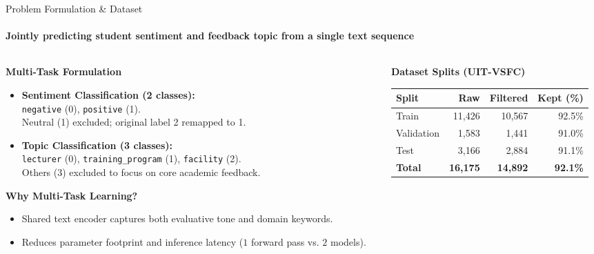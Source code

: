 \documentclass[aspectratio=169,10pt]{beamer}
\begin{document}
\begin{frame}{Problem Formulation \& Dataset}
  \framesubtitle{Jointly predicting student sentiment and feedback topic from a single text sequence}
  \begin{columns}[T,totalwidth=\textwidth]
    \begin{column}{0.52\textwidth}
      \textbf{Multi-Task Formulation}
      \begin{itemize}
        \item \textbf{Sentiment Classification (2 classes):}\\
              \texttt{negative} (0), \texttt{positive} (1).\\
              {\scriptsize\color{bwGray} Neutral (1) excluded; original label 2 remapped to 1.}
        \item \textbf{Topic Classification (3 classes):}\\
              \texttt{lecturer} (0), \texttt{training\_program} (1), \texttt{facility} (2).\\
              {\scriptsize\color{bwGray} Others (3) excluded to focus on core academic feedback.}
      \end{itemize}

      \vspace{0.4em}
      \textbf{Why Multi-Task Learning?}
      \begin{itemize}\scriptsize
        \item Shared text encoder captures both evaluative tone and domain keywords.
        \item Reduces parameter footprint and inference latency ($1$ forward pass vs. $2$ models).
      \end{itemize}
    \end{column}

    \begin{column}{0.45\textwidth}
      \textbf{Dataset Splits (UIT-VSFC)}
      \vspace{0.3em}
      \begin{table}
        \centering
        \footnotesize
        \begin{tabular}{lrrr}
          \toprule
          \textbf{Split} & \textbf{Raw} & \textbf{Filtered} & \textbf{Kept (\%)} \\
          \midrule
          Train          & 11,426       & 10,567            & 92.5\% \\
          Validation     & 1,583        & 1,441             & 91.0\% \\
          Test           & 3,166        & 2,884             & 91.1\% \\
          \midrule
          \textbf{Total} & \textbf{16,175} & \textbf{14,892} & \textbf{92.1\%} \\
          \bottomrule
        \end{tabular}
      \end{table}


\end{column}
\end{columns}
\end{frame}
\end{document}
